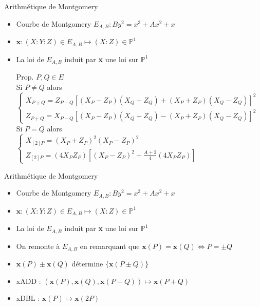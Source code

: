 \documentclass{beamer}
\begin{document}
\newcommand{\x}{\textbf{x}}
\begin{frame}{Arithmétique de Montgomery}
	\begin{itemize}
		\item{ Courbe de Montgomery $E_{A,B} : By^2 = x^3+Ax^2 + x$}
		\item{ $\x\colon (X:Y:Z) \in E_{A,B} \mapsto (X:Z) \in \mathbb{P}^1$}
		\item{La loi de $E_{A,B}$ induit par {\x} une loi sur $\mathbb{P}^1$}
		\item[Prop.]{$P,Q\in E$\\ \hspace{-20pt}
			Si $P\neq Q$ alors\\
			{\small$\left\{\begin{array}{l}
					X_{P+Q} = Z_{P-Q}[(X_P-Z_P)(X_Q+Z_Q) + (X_P+Z_P)(X_Q-Z_Q)]^2\\
					Z_{P+Q} = X_{P-Q}[(X_P-Z_P)(X_Q+Z_Q) - (X_P+Z_P)(X_Q-Z_Q)]^2
				\end{array}\right.$}\\ \hspace{-20pt}
			Si $P=Q$ alors\\
			{\small$\left\{\begin{array}{l}
					X_{[2]P}=(X_P + Z_P)^2(X_P - Z_P)^2 \\
					Z_{[2]P}=(4 X_P Z_P)[(X_P - Z_P)^2 + \frac{A+2}{4}(4 X_P Z_P)]
				\end{array}\right.$}}
\end{itemize}\end{frame}

\begin{frame}{Arithmétique de Montgomery}
	\begin{itemize}
		\item{ Courbe de Montgomery $E_{A,B} : By^2 = x^3+Ax^2 + x$}
		\item{ $\x\colon (X:Y:Z) \in E_{A,B} \mapsto (X:Z) \in \mathbb{P}^1$}
		\item{La loi de $E_{A,B}$ induit par {\x} une loi sur $\mathbb{P}^1$}
		\item{On remonte à $E_{A,B}$ en remarquant que $\x(P)=\x(Q)\Leftrightarrow P=\pm Q$}
		\item{ $\x(P)\pm\x(Q)$ détermine $\lbrace\x(P \pm Q)\rbrace$}
		\item{xADD : $(\x(P),\x(Q), \x(P-Q)) \mapsto \x(P+Q)$}
		\item{xDBL : $\x(P) \mapsto \x(2P)$}
	\end{itemize}
\end{frame}
\end{document}
